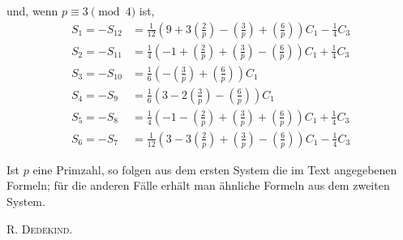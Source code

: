 und, wenn $p\equiv3\pmod4$ ist,
\[
\begin{aligned}
S_1=-S_{12}&=\tfrac1{12}\left(9+3\left(\frac2p\right)-\left(\frac3p\right)+\left(\frac6p\right)\right)C_1-\tfrac14C_3\\
S_2=-S_{11}&=\tfrac14\left(-1+\left(\frac2p\right)+\left(\frac3p\right)-\left(\frac6p\right)\right)C_1+\tfrac14C_3\\
S_3=-S_{10}&=\tfrac16\left(-\left(\frac3p\right)+\left(\frac6p\right)\right)C_1\\
S_4=-S_9&=\tfrac16\left(3-2\left(\frac3p\right)-\left(\frac6p\right)\right)C_1\\
S_5=-S_8&=\tfrac14\left(-1-\left(\frac2p\right)+\left(\frac3p\right)+\left(\frac6p\right)\right)C_1+\tfrac14C_3\\
S_6=-S_7&=\tfrac1{12}\left(3-3\left(\frac2p\right)+\left(\frac3p\right)-\left(\frac6p\right)\right)C_1-\tfrac14C_3
\end{aligned}
\]

Ist $p$ eine Primzahl, so folgen aus dem ersten System die im Text angegebenen Formeln; für die anderen Fälle erhält man ähnliche Formeln aus dem zweiten System.
\begin{flushright}\textsc{R. Dedekind.}\end{flushright}
\BookRule{55mm}

